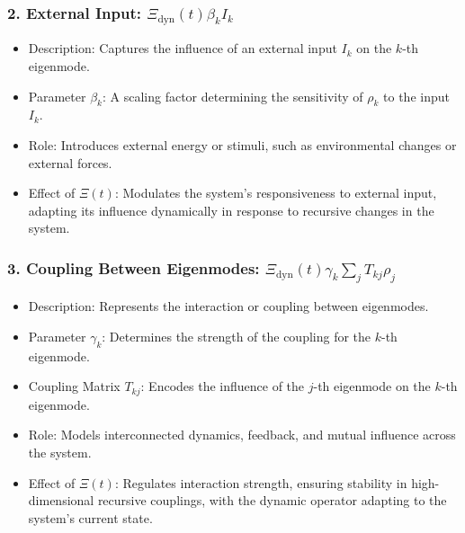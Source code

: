 \documentclass{article}
\theoremstyle{plain}
\begin{document}
\subsubsection{2. External Input: \( \Xi_{\text{dyn}}(t) \beta_k I_k \)}
\begin{itemize}
    \item Description: Captures the influence of an external input \( I_k \) on the \( k \)-th eigenmode.
    \item Parameter \( \beta_k \): A scaling factor determining the sensitivity of \( \rho_k \) to the input \( I_k \).
    \item Role: Introduces external energy or stimuli, such as environmental changes or external forces.
    \item Effect of \(\Xi(t) \): Modulates the system’s responsiveness to external input, adapting its influence dynamically in response to recursive changes in the system.
\end{itemize}

\subsubsection{3. Coupling Between Eigenmodes: \( \Xi_{\text{dyn}}(t) \gamma_k \sum_j T_{kj} \rho_j \)}
\begin{itemize}
    \item Description: Represents the interaction or coupling between eigenmodes.
    \item Parameter \( \gamma_k \): Determines the strength of the coupling for the \( k \)-th eigenmode.
    \item Coupling Matrix \( T_{kj} \): Encodes the influence of the \( j \)-th eigenmode on the \( k \)-th eigenmode.
    \item Role: Models interconnected dynamics, feedback, and mutual influence across the system.
    \item Effect of \(\Xi(t) \): Regulates interaction strength, ensuring stability in high-dimensional recursive couplings, with the dynamic operator adapting to the system's current state.
\end{itemize}
\end{document}
